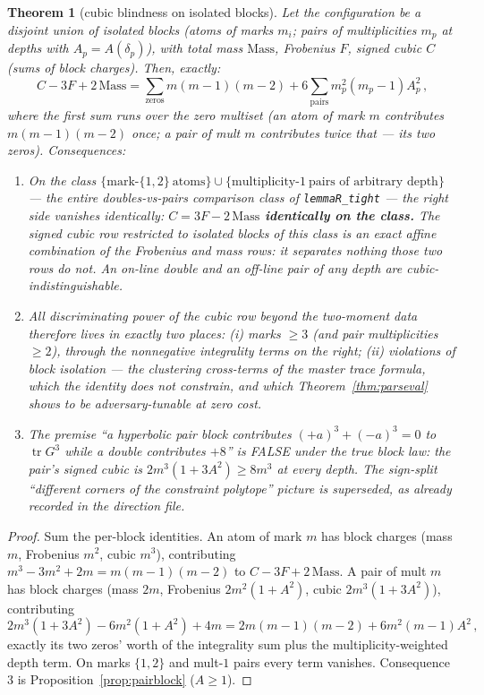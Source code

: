 \documentclass[11pt]{article}
\theoremstyle{plain}
\newtheorem{theorem}{Theorem}[section]
\theoremstyle{definition}
\theoremstyle{remark}
\newcommand{\tr}{\operatorname{tr}}
\begin{document}
\begin{theorem}[cubic blindness on isolated blocks]
\label{thm:blind}
Let the configuration be a disjoint union of isolated blocks (atoms of marks
$m_i$; pairs of multiplicities $m_p$ at depths with $A_p = A(\delta_p)$), with
total mass $\mathrm{Mass}$, Frobenius $F$, signed cubic $C$ (sums of block
charges). Then, exactly:
\[
  C - 3F + 2\,\mathrm{Mass}
  = \sum_{\mathrm{zeros}} m(m-1)(m-2)
    + 6 \sum_{\mathrm{pairs}} m_p^2 (m_p - 1) A_p^2 \,,
\]
where the first sum runs over the zero multiset (an atom of mark $m$ contributes
$m(m-1)(m-2)$ once; a pair of mult $m$ contributes twice that --- its two zeros).
Consequences:
\begin{enumerate}
\item On the class $\{\text{mark-}\{1,2\}\ \text{atoms}\} \cup
  \{\text{multiplicity-}1\ \text{pairs of arbitrary depth}\}$ --- the entire
  doubles-vs-pairs comparison class of \texttt{lemmaR\_tight} --- the right side
  vanishes identically: \textbf{$C = 3F - 2\,\mathrm{Mass}$ identically on the
  class.} The signed cubic row restricted to isolated blocks of this class is an
  exact affine combination of the Frobenius and mass rows: it separates nothing
  those two rows do not. An on-line double and an off-line pair of any depth are
  cubic-indistinguishable.
\item All discriminating power of the cubic row beyond the two-moment data
  therefore lives in exactly two places: (i) marks $\ge 3$ (and pair
  multiplicities $\ge 2$), through the nonnegative integrality terms on the
  right; (ii) violations of block isolation --- the clustering cross-terms of the
  master trace formula, which the identity does not constrain, and which
  Theorem~\ref{thm:parseval} shows to be adversary-tunable at zero cost.
\item The premise ``a hyperbolic pair block contributes $(+a)^3 + (-a)^3 = 0$ to
  $\tr G^3$ while a double contributes $+8$'' is FALSE under the true block law:
  the pair's signed cubic is $2m^3(1 + 3A^2) \ge 8m^3$ at every depth. The
  sign-split ``different corners of the constraint polytope'' picture is
  superseded, as already recorded in the direction file.
\end{enumerate}
\end{theorem}

\begin{proof}
Sum the per-block identities. An atom of mark $m$ has block charges
(mass $m$, Frobenius $m^2$, cubic $m^3$), contributing
$m^3 - 3m^2 + 2m = m(m-1)(m-2)$ to $C - 3F + 2\,\mathrm{Mass}$. A pair of mult
$m$ has block charges (mass $2m$, Frobenius $2m^2(1 + A^2)$, cubic
$2m^3(1 + 3A^2)$), contributing
\[
  2m^3(1 + 3A^2) - 6m^2(1 + A^2) + 4m
  = 2m(m-1)(m-2) + 6m^2(m-1)A^2 \,,
\]
exactly its two zeros' worth of the integrality sum plus the
multiplicity-weighted depth term. On marks $\{1,2\}$ and mult-$1$ pairs every
term vanishes. Consequence 3 is Proposition~\ref{prop:pairblock} ($A \ge 1$).
\end{proof}
\end{document}
